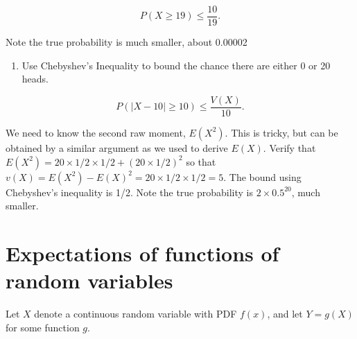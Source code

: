 \documentclass[]{book}
\providecommand{\tightlist}{%
  \setlength{\itemsep}{0pt}\setlength{\parskip}{0pt}}
\begin{document}
\[P(X \geq 19) \leq \frac{10}{19}.\]

Note the true probability is much smaller, about 0.00002

\begin{enumerate}
\def\labelenumi{\arabic{enumi}.}
\setcounter{enumi}{1}
\tightlist
\item
  Use Chebyshev's Inequality to bound the chance there are either 0 or
  20 heads.
\end{enumerate}

\[P(|X - 10|\geq 10)\leq \frac{V(X)}{10}.\]

We need to know the second raw moment, \(E(X^2)\). This is tricky, but
can be obtained by a similar argument as we used to derive \(E(X)\).
Verify that \(E(X^2) = 20\times 1/2 \times 1/2 + (20\times 1/2)^2\) so
that \(v(X) = E(X^2) - E(X)^2 = 20\times 1/2 \times 1/2 = 5\). The bound
using Chebyshev's inequality is 1/2. Note the true probability is
\(2\times 0.5^{20}\), much smaller.

\section{Expectations of functions of random
variables}\label{expectations-of-functions-of-random-variables}

Let \(X\) denote a continuous random variable with PDF \(f(x)\), and let
\(Y = g(X)\) for some function \(g\).


\end{document}
